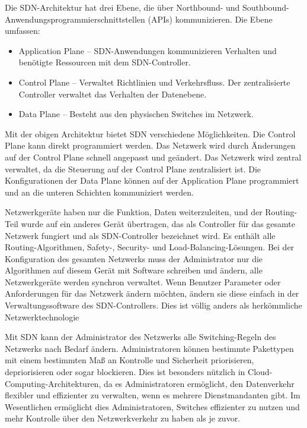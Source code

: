 \documentclass[fontsize=12pt,paper=a4,open=any,parskip=half,
  twoside=false,toc=listof,toc=bibliography,fleqn,leqno,
  captions=nooneline,captions=tableabove,british]{scrbook}
\begin{document}
Die SDN-Architektur hat drei Ebene, die über Northbound- und Southbound\hyp{}Anwendungsprogrammierschnittstellen (APIs) kommunizieren. Die Ebene umfassen:
\begin{itemize}
	\item Application Plane – SDN-Anwendungen kommunizieren Verhalten und benötigte Ressourcen mit dem SDN-Controller.
	\item Control Plane – Verwaltet Richtlinien und Verkehrsfluss. Der zentralisierte Controller verwaltet das Verhalten der Datenebene.
	\item Data Plane – Besteht aus den physischen Switches im Netzwerk.\cite{SDNdefTung}
\end{itemize}



Mit der obigen Architektur bietet SDN verschiedene Möglichkeiten. Die Control Plane kann direkt programmiert werden. Das Netzwerk wird durch Änderungen auf der Control Plane schnell angepasst und geändert. Das Netzwerk wird zentral verwaltet, da die Steuerung auf der Control Plane zentralisiert ist. Die Konfigurationen der Data Plane können auf der Application Plane programmiert und an die unteren Schichten kommuniziert werden.

Netzwerkgeräte haben nur die Funktion, Daten weiterzuleiten, und der Routing-Teil wurde auf ein anderes Gerät übertragen, das als Controller für das gesamte Netzwerk fungiert und als SDN-Controller bezeichnet wird. Es enthält alle Routing-Algorithmen, Safety-, Security- und Load-Balancing-Lösungen. Bei der Konfiguration des gesamten Netzwerks muss der Administrator nur die Algorithmen auf diesem Gerät mit Software schreiben und ändern, alle Netzwerkgeräte werden synchron verwaltet. Wenn Benutzer Parameter oder Anforderungen für das Netzwerk ändern möchten, ändern sie diese einfach in der Verwaltungssoftware des SDN-Controllers. Dies ist völlig anders als herkömmliche Netzwerktechnologie \cite[37-38]{ 6553676}


Mit SDN kann der Administrator des Netzwerks alle Switching-Regeln des Netzwerks nach Bedarf ändern. Administratoren können bestimmte Pakettypen mit einem bestimmten Maß an Kontrolle und Sicherheit priorisieren, depriorisieren oder sogar blockieren. Dies ist besonders nützlich in Cloud-Computing-Architekturen, da es Administratoren ermöglicht, den Datenverkehr flexibler und effizienter zu verwalten, wenn es mehrere Dienstmandanten gibt. Im Wesentlichen ermöglicht dies Administratoren, Switches effizienter zu nutzen und mehr Kontrolle über den Netzwerkverkehr zu haben als je zuvor. \cite{cloudcomputing}
\end{document}
